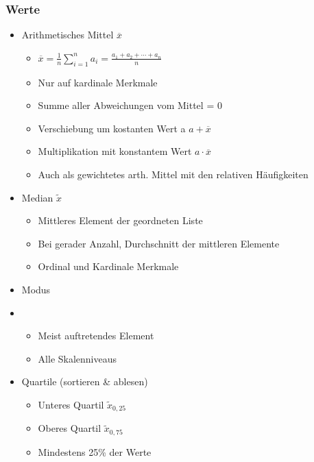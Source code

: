\documentclass[a4paper]{article}
\begin{document}
\begin{landscape}
\begin{multicols}{4}
    \subsubsection*{Werte}
    \begin{itemize}[noitemsep,nolistsep,leftmargin=*]
        \item Arithmetisches Mittel $\overline{x}$
        \begin{itemize}[noitemsep,nolistsep,leftmargin=*]
            \item $\overline{x}=\frac{1}{n}\sum _{i=1}^{n}a_{i}={\frac {a_{1}+a_{2}+\cdots +a_{n}}{n}}$ 
            \item Nur auf kardinale Merkmale
            \item Summe aller Abweichungen vom Mittel = 0
            \item Verschiebung um kostanten Wert a $a + \overline{x}$
            \item Multiplikation mit konstantem Wert $a \cdot \overline{x}$
            \item Auch als gewichtetes arth. Mittel mit den relativen Häufigkeiten
        \end{itemize}
        \item Median $\widetilde{x}$
        \begin{itemize}[noitemsep,nolistsep,leftmargin=*]
            \item Mittleres Element der geordneten Liste
            \item Bei gerader Anzahl, Durchschnitt der mittleren Elemente
            \item Ordinal und Kardinale Merkmale
        \end{itemize}
        \item Modus 
        \item \begin{itemize}[noitemsep,nolistsep,leftmargin=*]
            \item Meist auftretendes Element
            \item Alle Skalenniveaus
        \end{itemize}
        \item Quartile (sortieren \& ablesen)
        \begin{itemize}[noitemsep,nolistsep,leftmargin=*]
            \item Unteres Quartil $\widetilde{x}_{0,25}$ 
            \item Oberes Quartil $\widetilde{x}_{0,75}$
            \item Mindestens 25\% der Werte

\end{itemize}
\end{itemize}
\end{multicols}
\end{landscape}
\end{document}
